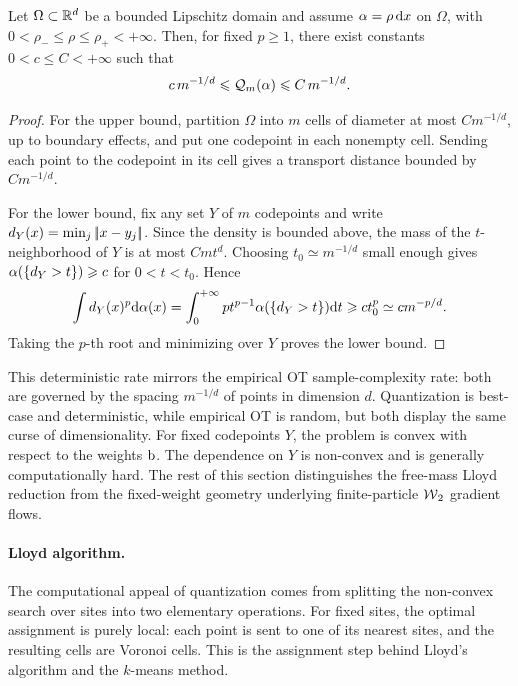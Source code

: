 \begin{prop}\label{prop-quantization-rate}
	Let $\Omega\subset\mathbb{R}^d$ be a bounded Lipschitz domain and assume $\alpha=\rho\,\mathrm{d} x$ on $\Omega$, with $0<\rho_-\leq\rho\leq\rho_+<+\infty$. Then, for fixed $p\geq1$, there exist constants $0<c\leq C<+\infty$ such that
	\[
		c\,m^{-1/d}
		\leqslant
		\mathcal{Q}_m(\alpha)
		\leqslant
		C\,m^{-1/d}.
	\]
\end{prop}
\begin{proof}
	For the upper bound, partition $\Omega$ into $m$ cells of diameter at most $Cm^{-1/d}$, up to boundary effects, and put one codepoint in each nonempty cell. Sending each point to the codepoint in its cell gives a transport distance bounded by $Cm^{-1/d}$.

	For the lower bound, fix any set $Y$ of $m$ codepoints and write $d_Y(x)=\min_j|\!| x-y_j |\!|$. Since the density is bounded above, the mass of the $t$-neighborhood of $Y$ is at most $Cmt^d$. Choosing $t_0\simeq m^{-1/d}$ small enough gives $\alpha(\{d_Y>t\})\geqslant c$ for $0<t<t_0$. Hence
	\[
		\int d_Y(x)^p\mathrm{d}\alpha(x)
		=
		\int_0^{+\infty} p t^{p-1}\alpha(\{d_Y>t\})\mathrm{d} t
		\geqslant
		c t_0^p
		\simeq
		c m^{-p/d}.
	\]
	Taking the $p$-th root and minimizing over $Y$ proves the lower bound.
\end{proof}

This deterministic rate mirrors the empirical OT sample-complexity rate: both are governed by the spacing $m^{-1/d}$ of points in dimension $d$. Quantization is best-case and deterministic, while empirical OT is random, but both display the same curse of dimensionality.
For fixed codepoints $Y$, the problem is convex with respect to the weights $\mathrm{b}$. The dependence on $Y$ is non-convex and is generally computationally hard. The rest of this section distinguishes the free-mass Lloyd reduction from the fixed-weight geometry underlying finite-particle $\operatorname{\mathcal{W}}_2$ gradient flows.

\paragraph{Lloyd algorithm.}
The computational appeal of quantization comes from splitting the non-convex search over sites into two elementary operations. For fixed sites, the optimal assignment is purely local: each point is sent to one of its nearest sites, and the resulting cells are Voronoi cells. This is the assignment step behind Lloyd's algorithm and the $k$-means method.

